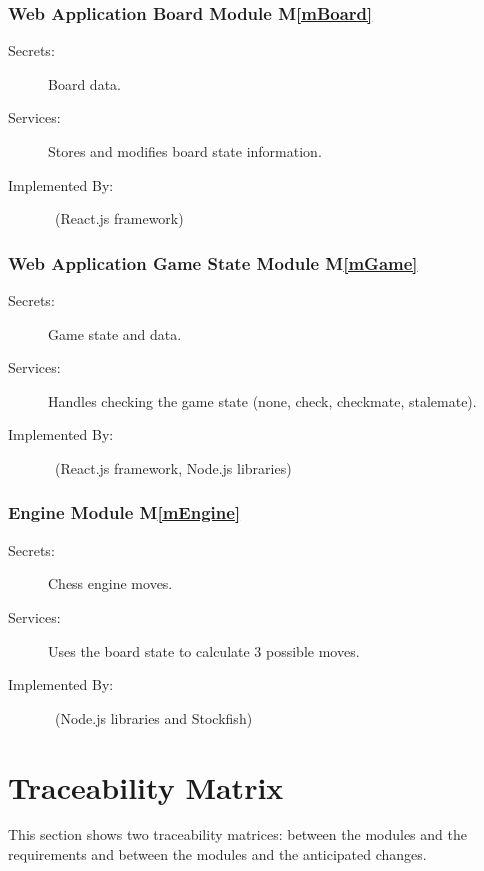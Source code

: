 \documentclass[12pt, titlepage]{article}
\newcommand{\mref}[1]{M\ref{#1}}
\begin{document}
    \subsubsection{Web Application Board Module \mref{mBoard}}
    \begin{description}
    \item[Secrets:] Board data.
    \item[Services:] Stores and modifies board state information.
    \item[Implemented By:] \progname\ (React.js framework)
    \end{description}

    \subsubsection{Web Application Game State Module \mref{mGame}}
    \begin{description}
    \item[Secrets:] Game state and data.
    \item[Services:] Handles checking the game state (none, check, checkmate, stalemate).
    \item[Implemented By:] \progname\ (React.js framework, Node.js libraries)
    \end{description}
    
    \subsubsection{Engine Module \mref{mEngine}}
    \begin{description}
    \item[Secrets:] Chess engine moves.
    \item[Services:] Uses the board state to calculate 3 possible moves.
    \item[Implemented By:] \progname\ (Node.js libraries and Stockfish)
    \end{description}



\section{Traceability Matrix} \label{SecTM}
This section shows two traceability matrices: between the modules and the
requirements and between the modules and the anticipated changes.
\end{document}
